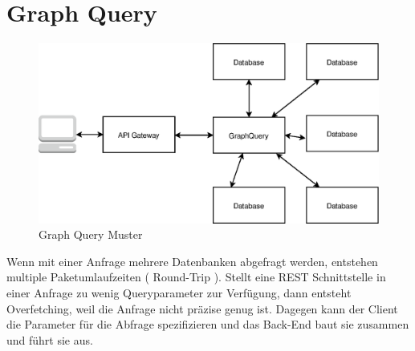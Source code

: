 \documentclass[
12pt,
english,
ngerman,
headsepline,
twoside,
openright,
numbers=noenddot,version=first
]{scrreprt}
\begin{document}
\section{Graph Query}
\begin{figure}[H]
	\centering
		\includegraphics[scale=0.60]{./pics/GraphQuery.eps}
	\caption{Graph Query Muster}
	\label{pic:graph-query}
\end{figure}
Wenn mit einer Anfrage mehrere Datenbanken abgefragt werden, entstehen multiple Paketumlaufzeiten ( Round-Trip ). Stellt eine \acrshort{REST} Schnittstelle in einer Anfrage zu wenig Queryparameter zur Verfügung, dann entsteht Overfetching, weil die Anfrage nicht präzise genug ist. Dagegen kann der Client die Parameter für die Abfrage spezifizieren und das Back-End baut sie zusammen und führt sie aus.
\end{document}
